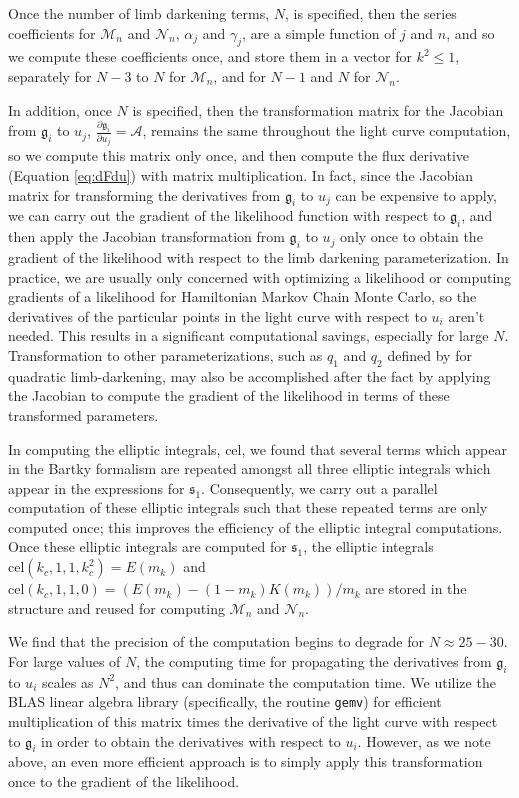 \documentclass[modern]{aastex61}
\begin{document}
Once the number of limb darkening
terms, $N$, is specified, then the series coefficients for $\mathcal{M}_n$
and $\mathcal{N}_n$, $\alpha_j$ and $\gamma_j$, are a simple function of $j$ 
and $n$, and so we compute these coefficients once, and store them in a vector 
for $k^2 \le 1$, separately for $N-3$ to $N$ for $\mathcal{M}_n$, and for 
$N-1$ and $N$ for $\mathcal{N}_n$.

In addition, once $N$ is specified, then the transformation matrix for
the Jacobian from $\mathfrak{g}_i$ to $u_j$, $\frac{\partial \mathfrak{g}_i}{\partial u_j}=\mathcal{A}$,  
remains the same throughout the light curve 
computation, so we compute this matrix only once, and then compute the
flux derivative (Equation \ref{eq:dFdu}) with matrix multiplication.
In fact, since the Jacobian matrix for transforming the derivatives from $\mathfrak{g}_i$
to $u_j$ can be expensive to apply, we can carry out the gradient of the 
likelihood function with respect to $\mathfrak{g}_i$, and then apply the Jacobian 
transformation from $\mathfrak{g}_i$ to $u_j$ only once to obtain the gradient
of the likelihood with respect to the limb darkening parameterization.
In practice, we are usually only concerned with optimizing a likelihood
or computing gradients of a likelihood for Hamiltonian Markov Chain
Monte Carlo, so the derivatives of the particular points in the
light curve with respect to $u_i$ aren't needed.  This results in a
significant computational savings, especially for large $N$.
Transformation to other parameterizations, such as $q_1$ and $q_2$
defined by \citet{Kipping2013} for quadratic limb-darkening, may also be accomplished after the
fact by applying the Jacobian to compute the gradient of the likelihood 
in terms of these transformed parameters.

In computing the elliptic integrals, cel, we found that several terms
which appear in the Bartky formalism are repeated amongst all three elliptic 
integrals which appear in the expressions for $\mathfrak{s}_1$.  Consequently, we carry 
out a parallel computation of these elliptic integrals such that these
repeated terms are only computed once;  this improves the efficiency of
the elliptic integral computations.  Once these elliptic integrals
are computed for $\mathfrak{s}_1$, the elliptic integrals $\mathrm{cel}(k_c,1,1,k_c^2)=E(m_k)$
and $\mathrm{cel}(k_c,1,1,0)=(E(m_k)-(1-m_k)K(m_k))/m_k $ are
stored in the structure and reused for computing $\mathcal{M}_n$
and $\mathcal{N}_n$.

We find that the precision of the computation begins to degrade for
$N \approx 25-30$.  For large values of $N$, the computing time for
propagating the derivatives from $\mathfrak{g}_i$ to $u_i$ scales as $N^2$, and
thus can dominate the computation time.  We utilize the BLAS linear
algebra library (specifically, the routine \texttt{gemv}) for efficient 
multiplication of this matrix times the derivative of the light curve with 
respect to $\mathfrak{g}_i$ in order to obtain the derivatives with respect to $u_i$.
However, as we note above, an even more efficient approach is to
simply apply this transformation once to the gradient of the likelihood.
\end{document}
